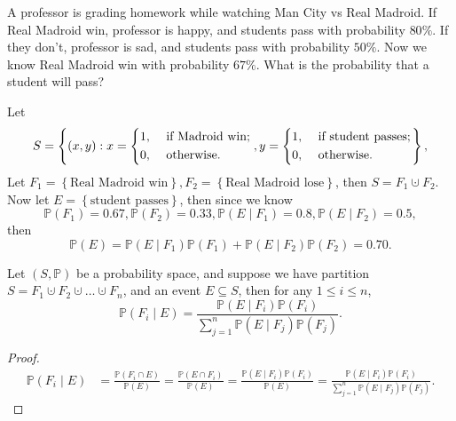 \begin{eg}
    A professor is grading homework while watching Man City vs Real Madroid. If Real Madroid win, professor is happy, and students pass with probability \(80 \%\). If they don't, professor is sad, and students pass with probability \(50 \%\). Now we know Real Madroid win with probability \(67 \%\). What is the probability that a student will pass?   
\end{eg}
\begin{explanation}
    Let
    \[
        S = \left\{ (x, y): x = \begin{dcases}
            1, &\text{ if } \text{Madroid win}  ;\\
            0, &\text{ otherwise}.
        \end{dcases}, y = \begin{dcases}
            1, &\text{ if } \text{student passes}  ;\\
            0, &\text{ otherwise}.
        \end{dcases} \right\}, 
    \]
    Let \(F_1 = \left\{ \text{Real Madroid win}  \right\}, F_2 = \left\{ \text{Real Madroid lose}  \right\}  \), then \(S = F_1 \cupdot F_2\). Now let \(E = \left\{ \text{student passes}  \right\} \), then since we know 
    \[
        \mathbb{P} (F_1) = 0.67, \mathbb{P} (F_2) = 0.33, \mathbb{P} (E \mid F_1) = 0.8, \mathbb{P} (E \mid F_2) = 0.5,
    \]   
    then 
    \[
        \mathbb{P} (E) = \mathbb{P} (E \mid F_1) \mathbb{P} (F_1) + \mathbb{P} (E \mid F_2) \mathbb{P} (F_2) = 0.70.
    \]
\end{explanation}

\begin{theorem}
    Let \((S, \mathbb{P} )\) be a probability space, and suppose we have partition \(S = F_1 \cupdot F_2 \cupdot \dots \cupdot F_n\), and an event \(E \subseteq S\), then for any \(1 \le i \le n\),
    \[
        \mathbb{P} (F_i \mid E) = \frac{\mathbb{P} (E \mid F_i) \mathbb{P} (F_i)}{\sum_{j=1}^n \mathbb{P} (E \mid F_j) \mathbb{P} (F_j) }.
    \]    
\end{theorem}
\begin{proof}
    \begin{align*}
        \mathbb{P} (F_i \mid E) &= \frac{\mathbb{P} (F_i \cap E)}{\mathbb{P} (E)} = \frac{\mathbb{P} (E \cap F_i)}{\mathbb{P} (E)} = \frac{\mathbb{P} (E \mid F_i) \mathbb{P} (F_i)}{\mathbb{P} (E)} = \frac{\mathbb{P} (E \mid F_i) \mathbb{P} (F_i)}{\sum_{j=1}^n \mathbb{P} (E \mid F_j) \mathbb{P} (F_j) }.
    \end{align*}
\end{proof}

